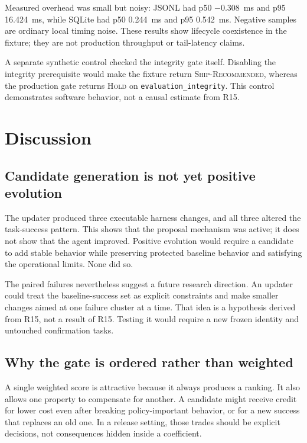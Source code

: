 \documentclass[10pt,twocolumn]{article}
\newcommand{\hold}{\textsc{Hold}\xspace}
\newcommand{\ship}{\textsc{Ship-Recommended}\xspace}
\newcommand{\code}[1]{\texttt{#1}}
\begin{document}
Measured overhead was small but noisy: JSONL had p50 $-0.308$~ms and p95
16.424~ms, while SQLite had p50 0.244~ms and p95 0.542~ms. Negative samples are
ordinary local timing noise. These results show lifecycle coexistence in the
fixture; they are not production throughput or tail-latency claims.

A separate synthetic control checked the integrity gate itself. Disabling the
integrity prerequisite would make the fixture return \ship, whereas the
production gate returns \hold on \code{evaluation\_integrity}. This control
demonstrates software behavior, not a causal estimate from R15.

\section{Discussion}

\subsection{Candidate generation is not yet positive evolution}

The updater produced three executable harness changes, and all three altered
the task-success pattern. This shows that the proposal mechanism was active;
it does not show that the agent improved. Positive evolution would require a
candidate to add stable behavior while preserving protected baseline behavior
and satisfying the operational limits. None did so.

The paired failures nevertheless suggest a future research direction. An
updater could treat the baseline-success set as explicit constraints and make
smaller changes aimed at one failure cluster at a time. That idea is a
hypothesis derived from R15, not a result of R15. Testing it would require a
new frozen identity and untouched confirmation tasks.

\subsection{Why the gate is ordered rather than weighted}

A single weighted score is attractive because it always produces a ranking.
It also allows one property to compensate for another. A candidate might
receive credit for lower cost even after breaking policy-important behavior, or
for a new success that replaces an old one. In a release setting, those trades
should be explicit decisions, not consequences hidden inside a coefficient.
\end{document}
